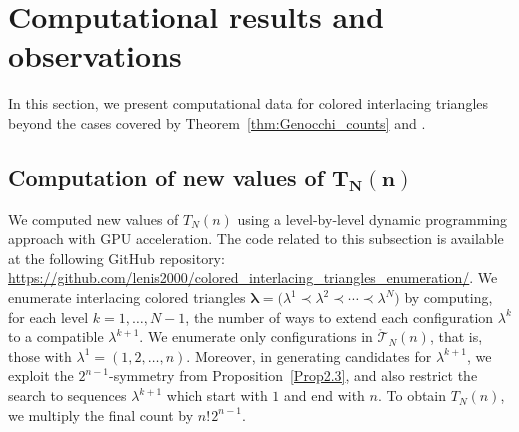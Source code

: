 \documentclass[10pt,a4paper]{amsart}
\numberwithin{equation}{section}
\newcommand{\ssp}{\hspace{1pt}}
\theoremstyle{definition}
\begin{document}
\section{Computational results and observations}\label{sec:enumeration}

In this section, we present computational data for colored interlacing triangles
beyond the cases covered by Theorem~\ref{thm:Genocchi_counts} and
\cite{gaetz2023bijection}.

\subsection[Computation of new values of T\_N(n)]{Computation of new values of $\boldsymbol{T_N(n)}$}
\label{subsec:computational_approach}

We computed new values of $T_N(n)$ using a level-by-level dynamic programming
approach with GPU acceleration.
The code related to this subsection is available at the following GitHub
repository:\!
\url{https://github.com/lenis2000/colored_interlacing_triangles_enumeration/}.\!
 We enumerate interlacing colored triangles
$\boldsymbol\lambda = \bigl(\lambda^1 \prec \lambda^2 \prec \cdots \prec \lambda^N\bigr)$
by computing, for each level $k = 1, \dots, N-1$, the number of ways to extend
each configuration $\lambda^k$ to a compatible $\lambda^{k+1}$.
We enumerate only configurations in $\mathring{\mathcal{T}}_N(n)$, that is,
those with $\lambda^1=(1,2,\dots,n)$.
Moreover, in generating candidates for $\lambda^{k+1}$, we exploit the
$2^{n-1}$-symmetry from Proposition~\ref{Prop2.3}, and also
restrict the search to sequences $\lambda^{k+1}$ which start with $1$ and end
with $n$.
To obtain $T_N(n)$, we multiply the final count by $n!\ssp 2^{n-1}$.
\end{document}
